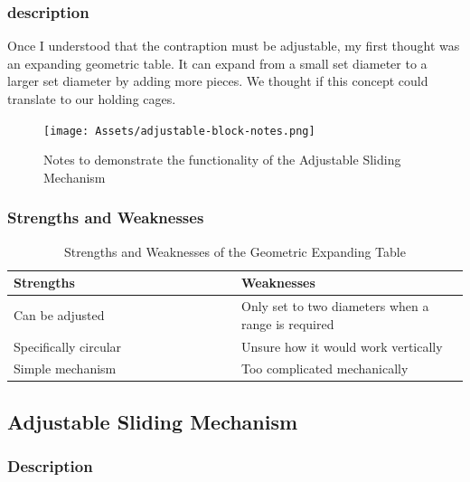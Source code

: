 \documentclass[a4paper,10pt]{article}
\begin{document}
\subsubsection{description}

Once I understood that the contraption must be adjustable, my first thought was an expanding geometric table. It can expand from a small set diameter to a larger set diameter by adding more pieces. We thought if this concept could translate to our holding cages.

\begin{figure}[H]
  \centering
  \texttt{[image: Assets/adjustable-block-notes.png]}
  \caption{Notes to demonstrate the functionality of the Adjustable Sliding Mechanism}
  \label{fig:adjustable-block-notes}
\end{figure}

\subsubsection{Strengths and Weaknesses}

\begin{table}[h]
  \centering
  \begin{tabular}{p{0.5\linewidth} | p{0.5\linewidth}}
    Strengths                                              & Weaknesses \\ \hline
    \textbullet{} Can be adjusted                          & \textbullet{} Only set to two diameters when a range is required \\
    \textbullet{} Specifically circular                    & \textbullet{} Unsure how it would work vertically \\
    \textbullet{} Simple mechanism                         & \textbullet{} Too complicated mechanically \\
  \end{tabular}
  \caption{Strengths and Weaknesses of the Geometric Expanding Table}
  \label{table:geometric-expanding-table-pros-cons}
\end{table}

\subsection{Adjustable Sliding Mechanism}

\subsubsection{Description}
\end{document}
